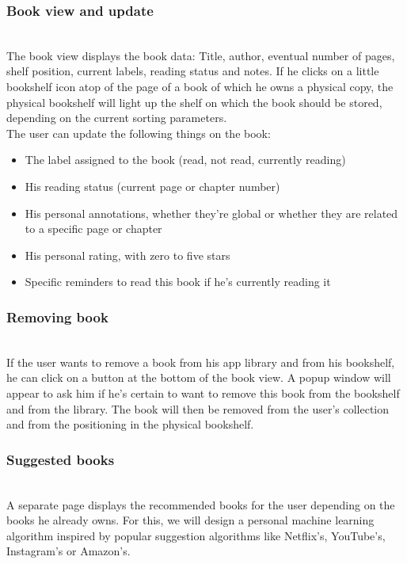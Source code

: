 \documentclass[conference]{IEEEtran}
\begin{document}
\subsubsection{Book view and update}\hfill\\
The book view displays the book data: Title, author, eventual number of pages, shelf position, current labels, reading status and notes. If he clicks on a little bookshelf icon atop of the page of a book of which he owns a physical copy, the physical bookshelf will light up the shelf on which the book should be stored, depending on the current sorting parameters.\\
The user can update the following things on the book:\\
\begin{itemize}
\item The label assigned to the book (read, not read, currently reading)
\item His reading status (current page or chapter number)
\item His personal annotations, whether they're global or whether they are related to a specific page or chapter
\item His personal rating, with zero to five stars
\item Specific reminders to read this book if he's currently reading it
\end{itemize}


\hfill


\subsubsection{Removing book}\hfill\\

If the user wants to remove a book from his app library and from his bookshelf, he can click on a button at the bottom of the book view. A popup window will appear to ask him if he's certain to want to remove this book from the bookshelf and from the library. The book will then be removed from the user's collection and from the positioning in the physical bookshelf.\\

\subsubsection{Suggested books}\hfill\\

A separate page displays the recommended books for the user depending on the books he already owns. For this, we will design a personal machine learning algorithm inspired by popular suggestion algorithms like Netflix's, YouTube's, Instagram's or Amazon's.\\
\end{document}
